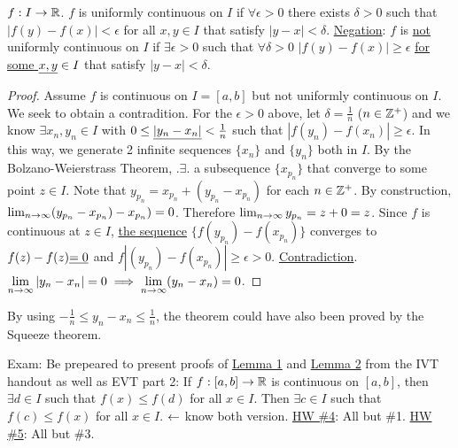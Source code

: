 \documentclass[]{article}
\begin{document}
\begin{example}
	 $f:I\rightarrow\mathbb{R}$. $f$ is uniformly continuous on $I$ if $\forall \epsilon>0$ there exists $\delta>0$ such that $|f(y)-f(x)|<\epsilon$ for all $x,y\in I$ that satisfy \ul{$|y-x|<\delta$}.
	\ul{Negation}: $f$ is \ul{not} uniformly continuous on $I$ if \ul{$\exists \epsilon>0$} such that $\forall \delta>0$ $|f(y)-f(x)|\geq \epsilon$ \ul{ \ul{for some} $\underline{x,y}\in I$} that satisfy $|y-x|<\delta$.
\end{example}
\begin{proof}
	Assume $f$ is continuous on $I=[a,b]$ but not uniformly continuous on $I$. We seek to obtain a contradition.
	For the \ul{$\epsilon>0$} above, let $\delta = \frac{1}{n}$ (\ul{$n\in\mathbb{Z}^+$}) and we know \ul{$\exists x_n,y_n\in I$} with \ul{$0\leq\underline{|y_n-x_n|}<\frac{1}{n}$} such that $|f(y_n)-f(x_n)| \geq \epsilon$.
	In this way, we generate 2 infinite sequences \ul{$\{x_n\}$} and $\{y_n\}$ both in \ul{$I$}.
	By the Bolzano-Weierstrass Theorem, $.\exists.$ a subsequence $\{x_{p_n}\}$ that converge to some point $z\in I$.
	Note that $y_{p_n} = x_{p_n} + (y_{p_n} - x_{p_n})$ for each $n\in\mathbb{Z}^+$. By construction, $\lim_{n\rightarrow\infty} (y_{p_n}-x_{p_n}) - x_{p_n}) = 0$.
	Therefore $\lim_{n\rightarrow\infty} y_{p_n} = z+0 = z$. Since $f$ is continuous at $z\in I$, \ul{the sequence} \ul{$\{f(y_{p_n})-f(x_{p_n})\}$} converges to $f(z)-f(z) \underline{= 0}$ and $f|(y_{p_n}) - f(x_{p_n})|\geq \epsilon>0$. \ul{Contradiction}. $\displaystyle\lim_{n\rightarrow\infty} |y_n - x_n| = 0 \implies \lim_{n\rightarrow\infty}(y_n - x_n) = 0$.
\end{proof}
\begin{remark}
	By using $-\frac{1}{n} \leq y_n - x_n \leq \frac{1}{n}$, the theorem could have also been proved by the Squeeze theorem.
\end{remark}
 
\newpage

Exam: Be prepeared to present proofs of \ul{Lemma 1} and \ul{Lemma 2} from the IVT handout as well as EVT part 2: 
If $f:[a,b]\rightarrow\mathbb{R}$ is continuous on $[a,b]$, then $\exists d\in I$ such that $f(x)\leq f(d)$ for all $x\in I$. 
Then $\exists c\in I$ such that $f(c) \leq f(x)$ for all $x\in I$. 
$\leftarrow$ know both version.
\ul{HW \#4}: All but \#1. \ul{HW \#5}: All but \#3.
\end{document}
